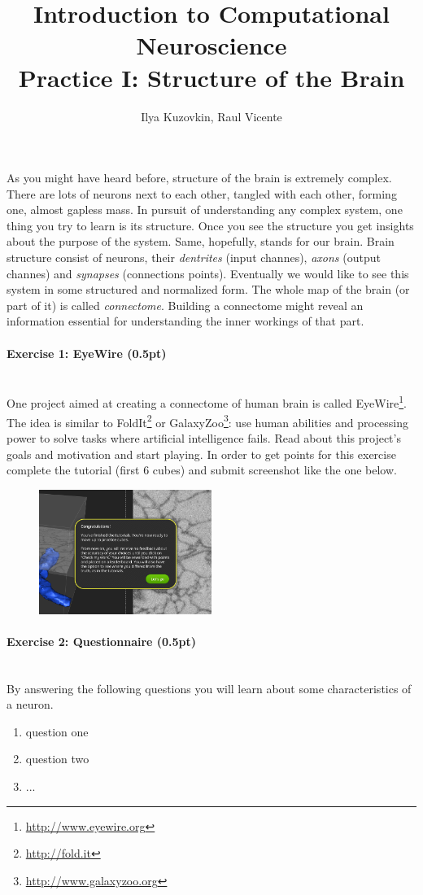 \documentclass[a4paper,11pt]{article}
\author{\large{Ilya Kuzovkin, Raul Vicente}}
\title{\huge{Introduction to Computational Neuroscience}\\\LARGE{Practice I: Structure of the Brain}}
\newenvironment{exercise}[3]{\paragraph{Exercise #1: #2 (#3pt)}\ \\}{
\medskip}
\begin{document}
\maketitle

As you might have heard before, structure of the brain is extremely complex. There are lots of neurons next to each other, tangled with each other, forming one, almost gapless mass. In pursuit of understanding any complex system, one thing you try to learn is its structure. Once you see the structure you get insights about the purpose of the system. Same, hopefully, stands for our brain. Brain structure consist of neurons, their \emph{dentrites} (input channes), \emph{axons} (output channes) and \emph{synapses} (connections points). Eventually we would like to see this system in some structured and normalized form. The whole map of the brain (or part of it) is called \emph{connectome}. Building a connectome might reveal an information essential for understanding the inner workings of that part. 

\begin{exercise}{1}{EyeWire}{0.5}
One project aimed at creating a connectome of human brain is called EyeWire\footnote{\url{http://www.eyewire.org}}. The idea is similar to FoldIt\footnote{\url{http://fold.it}} or GalaxyZoo\footnote{\url{http://www.galaxyzoo.org}}: use human abilities and processing power to solve tasks where artificial intelligence fails. Read about this project's goals and motivation and start playing. In order to get points for this exercise complete the tutorial (first 6 cubes) and submit screenshot like the one below.
\begin{figure}[htbp]
   \centering
   \includegraphics[width=0.5\textwidth]{eyewire.png} 
\end{figure}
\end{exercise}

\begin{exercise}{2}{Questionnaire}{0.5}
By answering the following questions you will learn about some characteristics of a neuron.
\begin{enumerate}
\itemsep 0em
	\item{question one}
	\item{question two}
	\item{...}
\end{enumerate}
\end{exercise}
\end{document}
